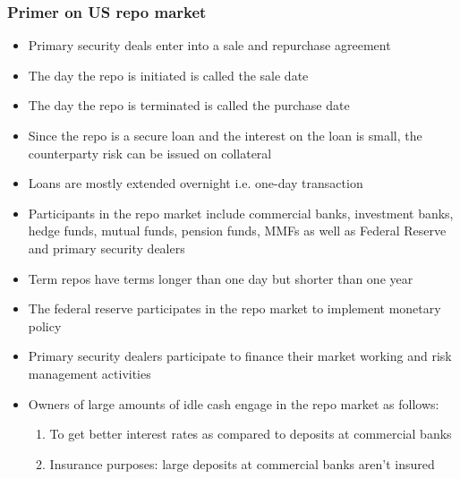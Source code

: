 \documentclass[11pt]{beamer}
\begin{document}
\begin{frame}
\frametitle{Primer on US repo market}
\begin{itemize}
\item Primary security deals enter into a sale and repurchase agreement
\item The day the repo is initiated is called the sale date
\item The day the repo is terminated is called the purchase date
\item Since the repo is a secure loan and the interest on the loan is small, the counterparty risk can be issued on collateral
\item Loans are mostly extended overnight i.e. one-day transaction
\item Participants in the repo market include commercial banks, investment banks, hedge funds, mutual funds, pension funds, MMFs as well as Federal Reserve and primary security dealers
\item Term repos have terms longer than one day but shorter than one year
\item The federal reserve participates in the repo market to implement monetary policy
\item Primary security dealers participate to finance their market working and risk management activities
\end{itemize}
\end{frame}

\begin{frame}
\begin{itemize}
\item Owners of large amounts of idle cash engage in the repo market as follows:
\begin{enumerate}
\item To get better interest rates as compared to deposits at commercial banks
\item Insurance purposes: large deposits at commercial banks aren't insured
\end{enumerate}
\end{itemize}
\end{frame}
\end{document}
